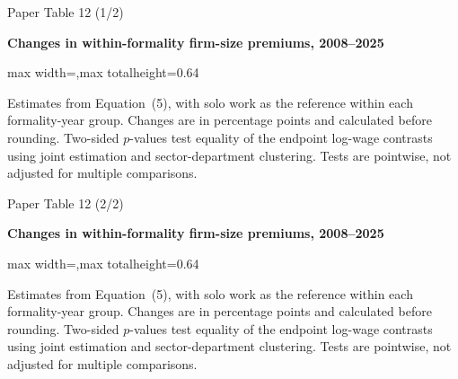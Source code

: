 \begin{frame}{Paper Table 12 (1/2)}
\begin{minipage}{\textwidth}\small\textbf{Changes in within-formality firm-size premiums, 2008--2025}\end{minipage}\par\vspace{0.15cm}
\centering\begingroup\fontsize{8.5}{10}\selectfont
\setlength{\tabcolsep}{4pt}\renewcommand{\arraystretch}{1.06}
\begin{adjustbox}{max width=\textwidth,max totalheight=0.64\textheight}

\end{adjustbox}\endgroup\par\vspace{0.10cm}
{\fontsize{6.5}{7.5}\selectfont\raggedright Estimates from Equation~(5), with solo work as the reference within each formality-year group. Changes are in percentage points and calculated before rounding. Two-sided $p$-values test equality of the endpoint log-wage contrasts using joint estimation and sector-department clustering. Tests are pointwise, not adjusted for multiple comparisons.\par}
\end{frame}

\begin{frame}{Paper Table 12 (2/2)}
\begin{minipage}{\textwidth}\small\textbf{Changes in within-formality firm-size premiums, 2008--2025}\end{minipage}\par\vspace{0.15cm}
\centering\begingroup\fontsize{8.5}{10}\selectfont
\setlength{\tabcolsep}{4pt}\renewcommand{\arraystretch}{1.06}
\begin{adjustbox}{max width=\textwidth,max totalheight=0.64\textheight}

\end{adjustbox}\endgroup\par\vspace{0.10cm}
{\fontsize{6.5}{7.5}\selectfont\raggedright Estimates from Equation~(5), with solo work as the reference within each formality-year group. Changes are in percentage points and calculated before rounding. Two-sided $p$-values test equality of the endpoint log-wage contrasts using joint estimation and sector-department clustering. Tests are pointwise, not adjusted for multiple comparisons.\par}
\end{frame}

